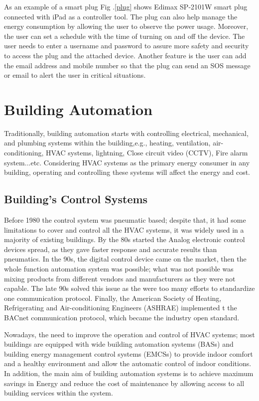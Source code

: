 \documentclass[conference]{IEEEtran}
\begin{document}
As an example of a smart plug Fig .\ref{plug} shows  Edimax SP-2101W smart plug connected with iPad as a controller tool. The plug can also help manage the energy consumption by allowing the user to observe the power usage. Moreover, the user can set a schedule with the time of turning on and off the device. The user needs to enter a username and password to assure more safety and security to access the plug and the attached device. Another feature is the user can add the email address and mobile number so that the plug can send an SOS message or email to alert the user in critical situations. 


\section{Building  Automation }

Traditionally, building automation starts with controlling electrical, mechanical, and plumbing systems within the building,e.g., heating, ventilation, air-conditioning, HVAC systems, lightning,  Close circuit video (CCTV), Fire alarm system...etc. Considering HVAC systems as the primary energy consumer in any building, operating and controlling these systems will affect the energy and cost.

\subsection{Building's Control Systems}

Before 1980 the control system was pneumatic based; despite that, it had some limitations to cover and control all the HVAC systems, it was widely used in a majority of existing buildings. By the 80s started the Analog electronic control devices spread, as they gave faster response and accurate results than pneumatics. In the 90s, the digital control device came on the market, then the whole function automation system was possible; what was not possible was mixing products from different vendors and manufacturers as they were not capable. The late 90s solved this issue as the were too many efforts to standardize one communication protocol. Finally, the American Society of Heating, Refrigerating and Air-conditioning Engineers (ASHRAE) implemented t the BACnet communication protocol, which became the industry open standard.\cite{control}

 Nowadays, the need to improve the operation and control of HVAC systems; most buildings are equipped with wide building automation systems (BASs) and building energy management control systems (EMCSs) to provide indoor comfort and a healthy environment and allow the automatic control of indoor conditions. In addition, the main aim of building automation systems is to achieve maximum savings in Energy and reduce the cost of maintenance by allowing access to all building services within the system.
\end{document}

